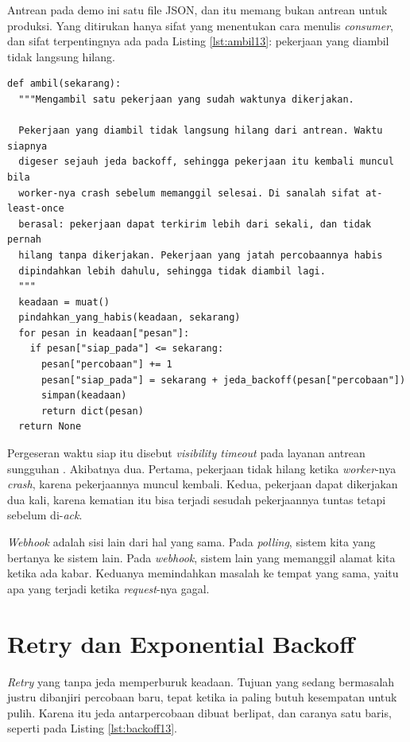 Antrean pada demo ini satu file JSON, dan itu memang bukan antrean untuk
produksi. Yang ditirukan hanya sifat yang menentukan cara menulis
\textit{consumer}, dan sifat terpentingnya ada pada Listing
\ref{lst:ambil13}: pekerjaan yang diambil tidak langsung hilang.

\begin{lstlisting}[style=PythonStyle, caption={Pekerjaan yang diambil hanya disembunyikan sementara, tersedia di \berkas{sources/chapter13/antrean.py}}, label={lst:ambil13}]
def ambil(sekarang):
  """Mengambil satu pekerjaan yang sudah waktunya dikerjakan.

  Pekerjaan yang diambil tidak langsung hilang dari antrean. Waktu siapnya
  digeser sejauh jeda backoff, sehingga pekerjaan itu kembali muncul bila
  worker-nya crash sebelum memanggil selesai. Di sanalah sifat at-least-once
  berasal: pekerjaan dapat terkirim lebih dari sekali, dan tidak pernah
  hilang tanpa dikerjakan. Pekerjaan yang jatah percobaannya habis
  dipindahkan lebih dahulu, sehingga tidak diambil lagi.
  """
  keadaan = muat()
  pindahkan_yang_habis(keadaan, sekarang)
  for pesan in keadaan["pesan"]:
    if pesan["siap_pada"] <= sekarang:
      pesan["percobaan"] += 1
      pesan["siap_pada"] = sekarang + jeda_backoff(pesan["percobaan"])
      simpan(keadaan)
      return dict(pesan)
  return None
\end{lstlisting}

Pergeseran waktu siap itu disebut \textit{visibility timeout} pada layanan
antrean sungguhan \cite{aws-sqs-visibility}. Akibatnya dua. Pertama,
pekerjaan tidak hilang ketika \textit{worker}-nya \textit{crash}, karena pekerjaannya
muncul kembali. Kedua, pekerjaan dapat dikerjakan dua kali, karena kematian
itu bisa terjadi sesudah pekerjaannya tuntas tetapi sebelum di-\textit{ack}.

\textit{Webhook} adalah sisi lain dari hal yang sama. Pada \textit{polling},
sistem kita yang bertanya ke sistem lain. Pada \textit{webhook}, sistem lain
yang memanggil alamat kita ketika ada kabar. Keduanya memindahkan masalah ke
tempat yang sama, yaitu apa yang terjadi ketika \textit{request}-nya gagal.

\section{Retry dan Exponential Backoff}

\textit{Retry} yang tanpa jeda memperburuk keadaan. Tujuan yang sedang
bermasalah justru dibanjiri percobaan baru, tepat ketika ia paling butuh
kesempatan untuk pulih. Karena itu jeda antarpercobaan dibuat berlipat, dan
caranya satu baris, seperti pada Listing \ref{lst:backoff13}.

